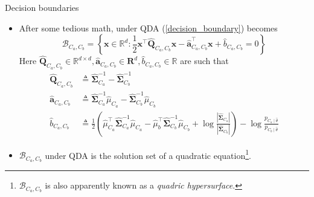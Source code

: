 \documentclass{beamer}
\numberwithin{equation}{section}
\newcommand{\aref}[1]{\alert{\ref{#1}}}
\begin{document}
\begin{frame}{Decision boundaries}
    \begin{itemize}
        \item
        After some tedious math, under QDA (\aref{decision_boundary}) becomes
        \begin{equation} \label{qda_decision_boundary}
            \mathcal{B}_{C_a, C_b} = \left\{
                \mathbf{x} \in \mathbb{R}^d : \frac{1}{2}
                \mathbf{x}^\top\hat{\mathbf{Q}}_{C_a, C_b}\mathbf{x} -
                \hat{\mathbf{a}}_{C_a, C_b}^\top\mathbf{x} +
                \hat{b}_{C_a, C_b} = 0
            \right\}
        \end{equation}
        Here $ \hat{\mathbf{Q}}_{C_a, C_b} \in \mathbb{R}^{d \times d},
        \hat{\mathbf{a}}_{C_a, C_b} \in \mathbf{R}^d, \hat{b}_{C_a, C_b} \in
        \mathbb{R} $ are such that
        \begin{equation*}%
            \begin{split}
            \hat{\mathbf{Q}}_{C_a, C_b} & \triangleq
                \hat{\mathbf{\Sigma}}_{C_a}^{-1} -
                \hat{\mathbf{\Sigma}}_{C_b}^{-1} \\
            \hat{\mathbf{a}}_{C_a, C_b} & \triangleq
                \hat{\mathbf{\Sigma}}_{C_a}^{-1}\hat{\mu}_{C_a} -
                \hat{\mathbf{\Sigma}}_{C_b}^{-1}\hat{\mu}_{C_b} \\
            \hat{b}_{C_a, C_b} & \triangleq
                \frac{1}{2}\left(
                    \hat{\mu}_{C_a}^\top
                    \hat{\mathbf{\Sigma}}_{C_a}^{-1}\hat{\mu}_{C_a} -
                    \hat{\mu}_b^\top
                    \hat{\mathbf{\Sigma}}_{C_b}^{-1}\hat{\mu}_{C_b} +
                    \log\frac{
                        |\hat{\mathbf{\Sigma}}_{C_a}|
                    }{|\hat{\mathbf{\Sigma}}_{C_b}|}
                \right) - \log\frac{p_{C_a \mid \hat{\theta}}}{
                    p_{C_b \mid \hat{\theta}}
                }
            \end{split}
        \end{equation*}

        \vspace{-5 pt}

        \item
        $ \mathcal{B}_{C_a, C_b} $ under QDA is the solution set of a
        quadratic equation\footnote{
            $ \mathcal{B}_{C_a, C_b} $ is also apparently known as a
            \textit{quadric hypersurface}.        
        }.
    \end{itemize}

    \medskip
\end{frame}
\end{document}
